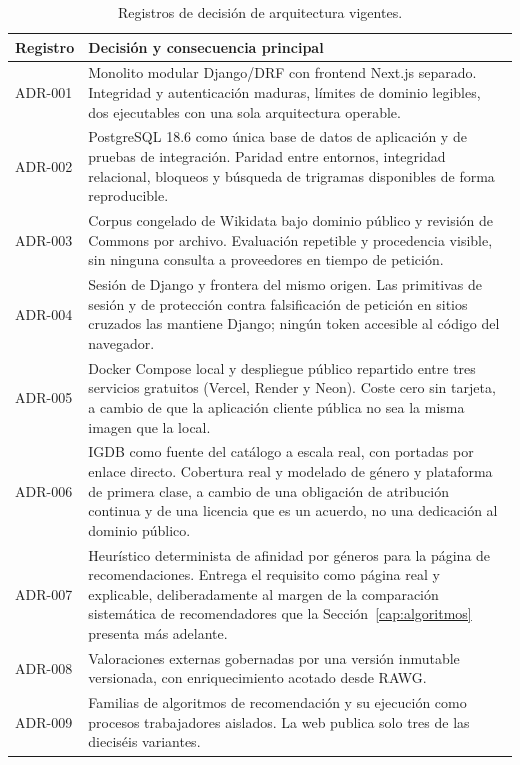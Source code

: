 \begin{table}[H]
\centering
\begin{tabularx}{\textwidth}{ | >{\raggedright\arraybackslash}p{} | Y | }
    \hline
    \textbf{Registro} & \textbf{Decisión y consecuencia principal} \\
    \hline
    ADR-001 & Monolito modular Django/DRF con frontend Next.js separado. Integridad y autenticación maduras, límites de dominio legibles, dos ejecutables con una sola arquitectura operable. \\
    \hline
    ADR-002 & PostgreSQL 18.6 como única base de datos de aplicación y de pruebas de integración. Paridad entre entornos, integridad relacional, bloqueos y búsqueda de trigramas disponibles de forma reproducible. \\
    \hline
    ADR-003 & Corpus congelado de Wikidata bajo dominio público y revisión de Commons por archivo. Evaluación repetible y procedencia visible, sin ninguna consulta a proveedores en tiempo de petición. \\
    \hline
    ADR-004 & Sesión de Django y frontera del mismo origen. Las primitivas de sesión y de protección contra falsificación de petición en sitios cruzados las mantiene Django; ningún token accesible al código del navegador. \\
    \hline
    ADR-005 & Docker Compose local y despliegue público repartido entre tres servicios gratuitos (Vercel, Render y Neon). Coste cero sin tarjeta, a cambio de que la aplicación cliente pública no sea la misma imagen que la local. \\
    \hline
    ADR-006 & IGDB como fuente del catálogo a escala real, con portadas por enlace directo. Cobertura real y modelado de género y plataforma de primera clase, a cambio de una obligación de atribución continua y de una licencia que es un acuerdo, no una dedicación al dominio público. \\
    \hline
    ADR-007 & Heurístico determinista de afinidad por géneros para la página de recomendaciones. Entrega el requisito como página real y explicable, deliberadamente al margen de la comparación sistemática de recomendadores que la Sección~\ref{cap:algoritmos} presenta más adelante. \\
    \hline
    ADR-008 & Valoraciones externas gobernadas por una versión inmutable versionada, con enriquecimiento acotado desde RAWG. \\
    \hline
    ADR-009 & Familias de algoritmos de recomendación y su ejecución como procesos trabajadores aislados. La web publica solo tres de las dieciséis variantes. \\
    \hline
\end{tabularx}
\caption{Registros de decisión de arquitectura vigentes.}
\label{tab:adr-resumen}
\end{table}

